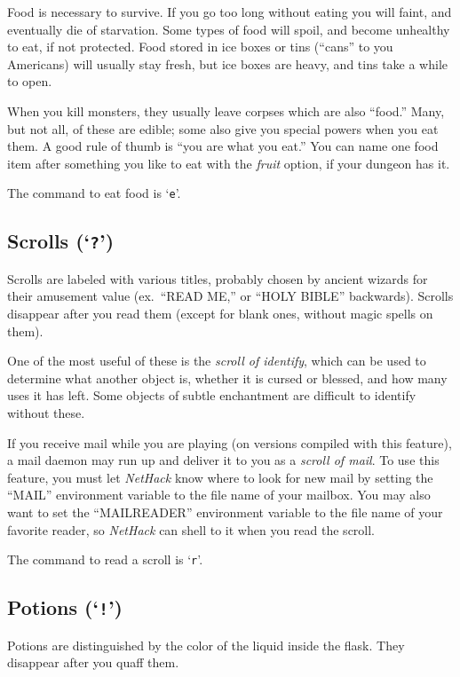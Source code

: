 Food is necessary to survive.  If you go too long without eating you
will faint, and eventually die of starvation.
Some types of food will spoil, and become unhealthy to eat,
if not protected.
Food stored in ice boxes or tins (``cans'' to you
Americans) will usually stay fresh, but ice boxes are heavy, and tins
take a while to open.

When you kill monsters, they usually leave corpses which are also
``food.''  Many, but not all, of these are edible; some also give you
special powers when you eat them.  A good rule of thumb is ``you are
what you eat.''
You can name one food item after something you like to eat with the
{\it fruit\/} option, if your dungeon has it.

The command to eat food is `{\tt e}'.

\subsection*{Scrolls (`{\tt ?}')}

Scrolls are labeled with various titles, probably chosen by ancient wizards
for their amusement value (ex.\ ``READ ME,'' or ``HOLY BIBLE'' backwards).
Scrolls disappear after you read them (except for blank ones, without
magic spells on them).

One of the most useful of these is the %
{\it scroll of identify}, which
can be used to determine what another object is, whether it is cursed or
blessed, and how many uses it has left.  Some objects of subtle
enchantment are difficult to identify without these.

If you receive mail while you are playing (on
versions compiled with this feature), a mail daemon may run up and
deliver it to you as a %
{\it scroll of mail}.  To use this feature,
you must let {\it NetHack\/} know where to look for new mail by setting the
``MAIL'' environment variable to the file name of your mailbox.  You
may also want to set the ``MAILREADER'' environment variable to the
file name of your favorite reader, so {\it NetHack\/} can shell to it when you
read the scroll.

The command to read a scroll is `{\tt r}'.

\subsection*{Potions (`{\tt !}')}

Potions are distinguished by the color of the liquid inside the flask.
They disappear after you quaff them.

